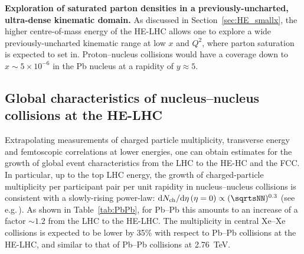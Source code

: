 \documentclass[../report.tex]{subfiles}
\begin{document}
\noindent
{\bf Exploration of saturated parton densities in a previously-uncharted, ultra-dense kinematic domain.}
As discussed in Section~\ref{sec:HE_smallx}, the higher centre-of-mass energy of the HE-LHC allows one to explore a wide previously-uncharted kinematic range 
at low $x$ and $Q^2$, where parton saturation is expected to set in.  
Proton--nucleus collisions would have a coverage down  to $x\sim 5\times 10^{-6}$ in the Pb nucleus at a rapidity of $y\approx 5$. 


\subsection{Global characteristics of nucleus--nucleus collisions at the HE-LHC}
\label{sec:HE_qgpglobal}

Extrapolating measurements of charged particle multiplicity, transverse energy and femtoscopic correlations 
at lower energies, one can obtain estimates
for the growth of global event characteristics from the LHC to the HE-HC and the FCC. In particular, up to the top LHC energy, the growth of charged-particle 
multiplicity per participant pair per unit rapidity in nucleus--nucleus collisions is consistent with a slowly-rising power-law:
   ${\rm d}N_{\rm ch}/{\rm d}\eta\,(\eta=0) \propto (\sqrtsNN)^{0.3}$ (see e.g.\,\cite{Aamodt:2010pb}).
As shown in Table~\ref{tab:PbPb}, for Pb--Pb this amounts to an increase of a factor $\sim 1.2$ from the LHC to the HE-LHC. 
The multiplicity in central Xe--Xe collisions is expected to be lower by 35\% with respect to Pb--Pb collisions at the HE-LHC, and similar to 
that of Pb--Pb collisions at 2.76~TeV.
\end{document}
